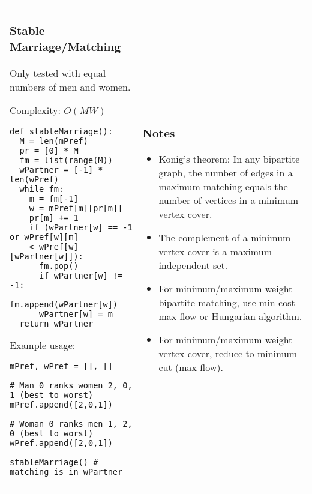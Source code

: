 \documentclass[letterpaper]{article}
\begin{document}
\vspace{-3em}
\begin{tabular}{@{}p{9cm}p{9cm}@{}}
    \subsubsection{Stable Marriage/Matching}

    Only tested with equal numbers of men and women.

    Complexity: $O\left(MW\right)$

    \begin{lstlisting}
def stableMarriage():
  M = len(mPref)
  pr = [0] * M
  fm = list(range(M))
  wPartner = [-1] * len(wPref)
  while fm:
    m = fm[-1]
    w = mPref[m][pr[m]]
    pr[m] += 1
    if (wPartner[w] == -1 or wPref[w][m]
    < wPref[w][wPartner[w]]):
      fm.pop()
      if wPartner[w] != -1:
        fm.append(wPartner[w])
      wPartner[w] = m
  return wPartner
\end{lstlisting}

    Example usage:
    \begin{lstlisting}
mPref, wPref = [], []

# Man 0 ranks women 2, 0, 1 (best to worst)
mPref.append([2,0,1])

# Woman 0 ranks men 1, 2, 0 (best to worst)
wPref.append([2,0,1])

stableMarriage() # matching is in wPartner
\end{lstlisting}
     &
    \subsubsection{Notes}
    \begin{itemize}
        \item Konig's theorem: In any bipartite graph, the number of edges in a maximum matching equals the number of vertices in a minimum vertex cover.
        \item The complement of a minimum vertex cover is a maximum independent set.
        \item For minimum/maximum weight bipartite matching, use min cost max flow or Hungarian algorithm.
        \item For minimum/maximum weight vertex cover, reduce to minimum cut (max flow).
    \end{itemize}
\end{tabular}

\clearpage

\end{document}
